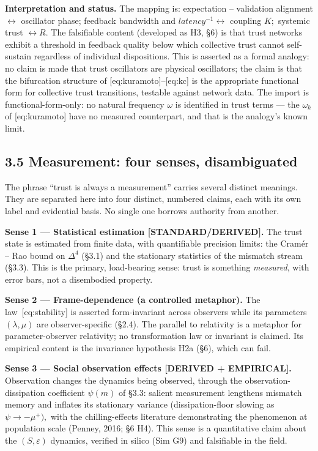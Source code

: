 \documentclass[
]{article}
\begin{document}
\textbf{Interpretation and status.} The mapping is: expectation --
validation alignment \(\leftrightarrow\) oscillator phase; feedback
bandwidth and \(latency^{-1} \leftrightarrow\) coupling \(K;\) systemic
trust \(\leftrightarrow R.\) The falsifiable content (developed as H3,
§6) is that trust networks exhibit a threshold in feedback quality below
which collective trust cannot self-sustain regardless of individual
dispositions. This is asserted as a formal analogy: no claim is made
that trust oscillators are physical oscillators; the claim is that the
bifurcation structure of {[}eq:kuramoto{]}--{[}eq:kc{]} is the
appropriate functional form for collective trust transitions, testable
against network data. The import is functional-form-only: no natural
frequency \(\omega\) is identified in trust terms --- the \(\omega_k\)
of {[}eq:kuramoto{]} have no measured counterpart, and that is the
analogy's known limit.

\subsection{3.5 Measurement: four senses,
disambiguated}\label{measurement-four-senses-disambiguated}

The phrase ``trust is always a measurement'' carries several distinct
meanings. They are separated here into four distinct, numbered claims,
each with its own label and evidential basis. No single one borrows
authority from another.

\textbf{Sense 1 --- Statistical estimation {[}STANDARD/DERIVED{]}.} The
trust state is estimated from finite data, with quantifiable precision
limits: the Cramér -- Rao bound on \(\Delta^{4}\) (§3.1) and the
stationary statistics of the mismatch stream (§3.3). This is the
primary, load-bearing sense: trust is something \emph{measured}, with
error bars, not a disembodied property.

\textbf{Sense 2 --- Frame-dependence (a controlled metaphor).} The
law~{[}eq:stability{]} is asserted form-invariant across observers while
its parameters \((\lambda, \mu)\) are observer-specific (§2.4). The
parallel to relativity is a metaphor for parameter-observer relativity;
no transformation law or invariant is claimed. Its empirical content is
the invariance hypothesis H2a (§6), which can fail.

\textbf{Sense 3 --- Social observation effects {[}DERIVED +
EMPIRICAL{]}.} Observation changes the dynamics being observed, through
the observation-dissipation coefficient \(\psi(m)\) of §3.3: salient
measurement lengthens mismatch memory and inflates its stationary
variance (dissipation-floor slowing as \(\psi \to -\mu^{+}),\) with the
chilling-effects literature demonstrating the phenomenon at population
scale (Penney, 2016; §6 H4). This sense is a quantitative claim about
the \((S, \varepsilon)\) dynamics, verified in silico (Sim G9) and
falsifiable in the field.
\end{document}
